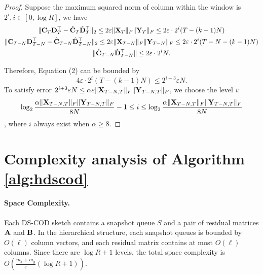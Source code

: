 \begin{proof}
Suppose the maximum squared norm of column within the window is $2^i, i\in[0,\log R]$, we have
\begin{gather}
    \| {\bf C}_T{\bf D}_T^\top-\hat{{\bf C}}_T\hat{{\bf D}}_T^\top \|_2 \leq 2\varepsilon\|{\bf X}_T\|_F\|{\bf Y}_T\|_F  \leq 2\varepsilon \cdot2^i(T-(k-1)N) \nonumber \\
    \| {\bf C}_{T-N}{\bf D}_{T-N}^\top - \hat{{\bf C}}_{T-N}\hat{{\bf D}}_{T-N}^\top \|_2 \leq 2\varepsilon\|{\bf X}_{T-N}\|_F\|{\bf Y}_{T-N}\|_F  \leq 2\varepsilon \cdot2^i(T-N-(k-1)N) \nonumber \\
    \| \hat{{\bf C}}_{T-N}\hat{{\bf D}}_{T-N}^\top\| \leq 2\varepsilon \cdot2^iN \nonumber.
\end{gather}

Therefore, Equation (2) can be bounded by
\[
    4\varepsilon \cdot 2^i(T-(k-1)N) \leq 2^{i+3}\varepsilon N.
\]
To satisfy error $2^{i+3}\varepsilon N \leq \alpha\varepsilon \|{\bf X}_{T-N,T}\|_F\|{\bf Y}_{T-N,T}\|_F$, we choose the level $i$:
\[
\log_2{\frac{\alpha\|{\bf X}_{T-N,T}\|_F\|{\bf Y}_{T-N,T}\|_F}{8N}}-1 \leq i \leq \log_2{\frac{\alpha\|{\bf X}_{T-N,T}\|_F\|{\bf Y}_{T-N,T}\|_F}{8N}}
\]
, where $i$ always exist when $\alpha\geq8$.
\end{proof}

\section{Complexity analysis of Algorithm \ref{alg:hdscod}} \label{apdx:comlexity}
\paragraph{Space Complexity.} Each DS-COD sketch contains a snapshot queue $S$ and a pair of residual matrices ${\bf A}$ and ${\bf B}$. In the hierarchical structure, each snapshot queues is bounded by $O(\ell)$ column vectors, and each residual matrix contains at most $O(\ell)$ columns. Since there are $\log R+1$ levels, the total space complexity is $O\left(\frac{m_x + m_y}{\varepsilon} (\log R+1)\right)$.
